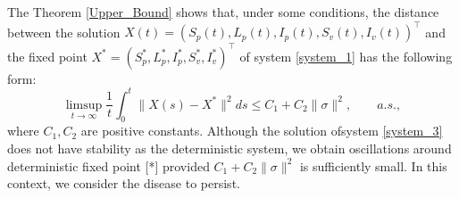 \begin{remark}
 	The Theorem \ref{Upper_Bound} shows that, under some conditions, the 
 	distance between the solution 
 	$
 		X(t)=(S_p(t),L_p(t),I_p(t),S_v(t),I_v(t))^\top
 	$ 
 	and the fixed point 
 	$
 		X^*=(S_p^*,L_p^*,I_p^*,S_v^*,I_v^*)^\top
 	$ of system \eqref{system_1} has the following form:
 	\begin{equation*}
  		\limsup_{t\to\infty}
  		\frac{1}{t}
  		\int_{0} ^ {t}
  			\|X(s) - X ^*\| ^ 2 
  		ds
  		\leq 
  		C_1 + C_2
  		\|\sigma\| ^ 2,
  		\qquad a.s.,
 	\end{equation*}
 	where $C_1, C_2$ are positive constants. Although the solution ofsystem 
 	\eqref{system_3} does not have stability as the deterministic system, we 
 	obtain oscillations around deterministic fixed point
 	[*] provided 
 	$
 		C_1 + C_2 
 		\|\sigma\|^2
 	$ is sufficiently small. In this context, we 
 	consider the disease to persist.
\end{remark}
